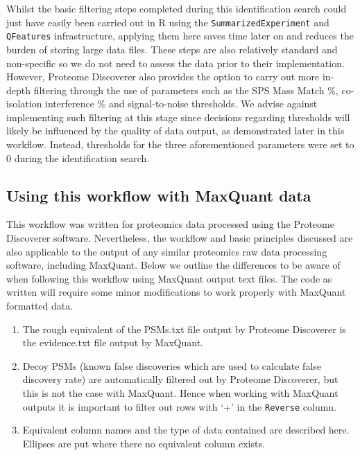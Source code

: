 \documentclass[9pt,a4paper,]{extarticle}
\begin{document}
Whilst the basic filtering steps completed during this identification search
could just have easily been carried out in R using the \texttt{SummarizedExperiment}
and \texttt{QFeatures} infrastructure, applying them here saves time later on and
reduces the burden of storing large data files. These steps are also relatively
standard and non-specific so we do not need to assess the data prior to their
implementation. However, Proteome Discoverer also provides the option to carry
out more in-depth filtering through the use of parameters such as the SPS Mass
Match \%, co-isolation interference \% and signal-to-noise thresholds. We advise
against implementing such filtering at this stage since decisions regarding
thresholds will likely be influenced by the quality of data output, as
demonstrated later in this workflow. Instead, thresholds for the three
aforementioned parameters were set to 0 during the identification search.

\subsection{Using this workflow with MaxQuant data}\label{using-this-workflow-with-maxquant-data}

This workflow was written for proteomics data processed using the Proteome
Discoverer software. Nevertheless, the workflow and basic principles discussed
are also applicable to the output of any similar proteomics raw data processing
software, including MaxQuant. Below we outline the differences to be aware of
when following this workflow using MaxQuant output text files. The code as
written will require some minor modifications to work properly with MaxQuant
formatted data.

\begin{enumerate}
\def\labelenumi{\arabic{enumi}.}
\item
  The rough equivalent of the PSMs.txt file output by Proteome Discoverer is
  the evidence.txt file output by MaxQuant.
\item
  Decoy PSMs (known false discoveries which are used to calculate false discovery
  rate) are automatically filtered out by Proteome Discoverer, but this is not the
  case with MaxQuant. Hence when working with MaxQuant outputs it is important to
  filter out rows with `+' in the \texttt{Reverse} column.
\item
  Equivalent column names and the type of data contained are described here.
  Ellipses are put where there no equivalent column exists.
\end{enumerate}
\end{document}
